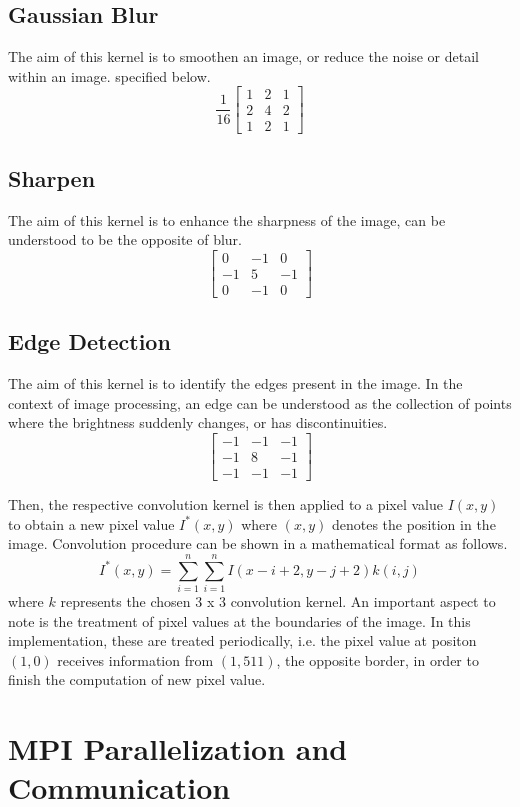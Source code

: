 \documentclass[sprache=english,fontsize=11,hausschrift=times,betreuerform=tabelle]{TUBAFarbeiten}
\begin{document}
\subsection{Gaussian Blur}
The aim of this kernel is to smoothen an image, or reduce the noise or detail within an image.
specified below. 
$$
    \frac{1}{16}
    \begin{bmatrix}
        1 & 2 & 1 \\ 2 & 4 & 2 \\ 1 & 2 & 1
    \end{bmatrix}
$$
\subsection{Sharpen}
The aim of this kernel is to enhance the sharpness of the image, can be understood to be the opposite of blur.
$$
    \begin{bmatrix}
        0 & -1 & 0 \\ -1 & 5 & -1 \\ 0 & -1 & 0
    \end{bmatrix}
$$
\subsection{Edge Detection}
The aim of this kernel is to identify the edges present in the image. In the context of image processing, an edge can be understood as the collection of 
points where the brightness suddenly changes, or has discontinuities.
$$
\begin{bmatrix}
    -1 & -1 & -1 \\ -1 & 8 & -1 \\ -1 & -1 & -1
\end{bmatrix}
$$

Then, the respective convolution kernel is then applied to a pixel value $I(x,y)$ to obtain a new pixel value $I^*(x,y)$ 
where $(x,y)$ denotes the position in the image. Convolution procedure can be shown in a mathematical format as follows.
$$ I^*(x,y) = \sum_{i=1}^{n}\sum_{i=1}^{n}I(x-i+2,y-j+2)k(i,j) $$ where $k$ represents the chosen 3 x 3 convolution kernel.
An important aspect to note is the treatment of pixel values at the boundaries of the image. In this implementation, these
are treated periodically, i.e. the pixel value at positon $(1,0)$ receives information from $(1,511)$, the opposite border,
in order to finish the computation of new pixel value.

\section{MPI Parallelization and Communication}
\end{document}
